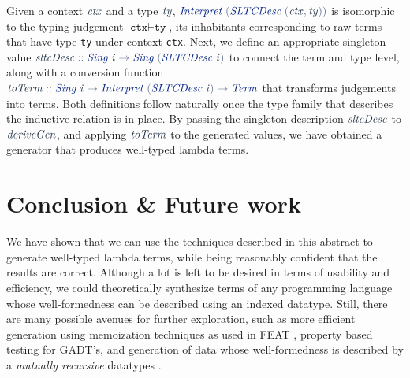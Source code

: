 \documentclass[acmsmall, nonacm]{acmart}
\newcommand*{\mathcolor}{}
\def\mathcolor#1#{\mathcoloraux{#1}}
\newcommand*{\mathcoloraux}[3]{%
  \protect\leavevmode
  \begingroup
    \color#1{#2}#3%
  \endgroup
}
\newcommand{\HSSpecial}[1]{\mathcolor{hsblue4}{#1}}
\newcommand{\HSSym}[1]{\mathcolor{hsblue4}{#1}}
\newcommand{\HSCon}[1]{\mathcolor{hsblue3}{\mathit{#1}}}
\newcommand{\HSVar}[1]{\mathcolor{hsblue5}{\mathit{#1}}}
\begin{document}
  Given a context \ensuremath{\HSVar{ctx}} and a type \ensuremath{\HSVar{ty}}, \ensuremath{\HSCon{Interpret}\;\HSSpecial{(}\HSCon{SLTCDesc}\;\HSSpecial{(}\HSVar{ctx}\HSSpecial{,}\HSVar{ty}\HSSpecial{)}\HSSpecial{)}} is isomorphic to the typing judgement $\texttt{ctx} \vdash \texttt{ty}$, its inhabitants corresponding to raw terms that have type \texttt{ty} under context \texttt{ctx}. Next, we define an appropriate singleton value \ensuremath{\HSVar{sltcDesc}\HSSym{::}\HSCon{Sing}\;\HSVar{i}\HSSym{\to} \HSCon{Sing}\;\HSSpecial{(}\HSCon{SLTCDesc}\;\HSVar{i}\HSSpecial{)}} to connect the term and type level, along with a conversion function \ensuremath{\HSVar{toTerm}\HSSym{::}\HSCon{Sing}\;\HSVar{i}\HSSym{\to} \HSCon{Interpret}\;\HSSpecial{(}\HSCon{SLTCDesc}\;\HSVar{i}\HSSpecial{)}\HSSym{\to} \HSCon{Term}} that transforms judgements into terms. Both definitions follow naturally once the type family that describes the inductive relation is in place. By passing the singleton description \ensuremath{\HSVar{sltcDesc}} to \ensuremath{\HSVar{deriveGen}}, and applying \ensuremath{\HSVar{toTerm}} to the generated values, we have obtained a generator that produces well-typed lambda terms. 

\vspace{-0.1cm}
\section*{Conclusion \& Future work}

  We have shown that we can use the techniques described in this abstract to generate well-typed lambda terms, while being reasonably confident that the results are correct. Although a lot is left to be desired in terms of usability and efficiency, we could theoretically synthesize terms of any programming language whose well-formedness can be described using an indexed datatype. Still, there are many possible avenues for further exploration, such as more efficient generation using memoization techniques as used in FEAT \cite{duregaard2013feat}, property based testing for GADT's, and generation of data whose well-formedness is described by a \emph{mutually recursive} datatypes \cite{miraldo2018sums, yakushev2009generic}. 
  

\end{document}
